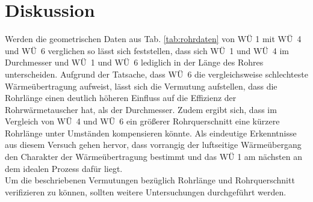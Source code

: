 \newpage
\section{Diskussion}
\label{sec:diskussion}
Werden die geometrischen Daten aus Tab. \ref{tab:rohrdaten} von WÜ 1 mit \mbox{WÜ 4} und \mbox{WÜ 6} verglichen so lässt sich feststellen, dass sich \mbox{WÜ 1} und \mbox{WÜ 4} im Durchmesser und \mbox{WÜ 1} und \mbox{WÜ 6} lediglich in der Länge des Rohres unterscheiden. \linebreak
Aufgrund der Tatsache, dass \mbox{WÜ 6} die vergleichsweise schlechteste Wärmeübertragung aufweist, lässt sich die Vermutung aufstellen, dass die Rohrlänge einen deutlich höheren Einfluss auf die Effizienz der Rohrwärmetauscher hat, als der Durchmesser. \linebreak 
Zudem ergibt sich, dass im Vergleich von \mbox{WÜ 4} und \mbox{WÜ 6} ein größerer Rohrquerschnitt eine kürzere Rohrlänge unter Umständen kompensieren könnte.\linebreak 
Als eindeutige Erkenntnisse aus diesem Versuch gehen hervor, dass vorrangig der luftseitige Wärmeübergang den Charakter der Wärmeübertragung bestimmt und das WÜ 1 am nächsten an dem idealen Prozess dafür liegt. \\
Um die beschriebenen Vermutungen bezüglich Rohrlänge und Rohrquerschnitt  verifizieren zu können, sollten weitere Untersuchungen durchgeführt werden.